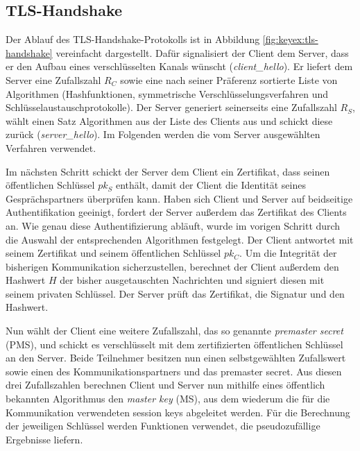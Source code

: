 \subsection{TLS-Handshake}
Der Ablauf des TLS-Handshake-Protokolls ist in Abbildung
\ref{fig:keyex:tls-handshake} vereinfacht dargestellt.
Dafür signalisiert der Client dem Server, dass er den Aufbau eines verschlüsselten Kanals wünscht (\emph{client\_hello}). Er liefert
dem Server eine Zufallszahl $R_C$ sowie eine nach seiner Präferenz sortierte Liste von Algorithmen (Hashfunktionen, symmetrische
Verschlüsselungsverfahren und Schlüsselaustauschprotokolle). Der Server generiert seinerseits eine Zufallszahl $R_S$, wählt einen Satz
Algorithmen aus der Liste des Clients aus und schickt diese zurück (\emph{server\_hello}). Im Folgenden werden die vom Server ausgewählten
Verfahren verwendet.

Im nächsten Schritt schickt der Server dem Client ein Zertifikat, dass
seinen öffentlichen Schlüssel $pk_S$ enthält, damit der Client
die Identität seines Gesprächspartners überprüfen kann. Haben sich
Client und Server auf beidseitige Authentifikation geeinigt, fordert der
Server außerdem das Zertifikat des Clients an.  Wie genau diese
Authentifizierung abläuft, wurde im vorigen Schritt durch die Auswahl
der entsprechenden Algorithmen festgelegt. Der Client antwortet mit
seinem Zertifikat und seinem öffentlichen Schlüssel $pk_C$. Um die
Integrität der bisherigen Kommunikation sicherzustellen, berechnet der
Client außerdem den Hashwert $H$ der bisher ausgetauschten Nachrichten
und signiert diesen mit seinem privaten Schlüssel. Der Server prüft das
Zertifikat, die Signatur und den Hashwert.

Nun wählt der Client eine weitere Zufallszahl, das so genannte \emph{premaster secret} (PMS), und schickt es verschlüsselt mit dem
zertifizierten öffentlichen Schlüssel an den Server. Beide Teilnehmer besitzen nun einen selbstgewählten Zufallswert sowie einen des
Kommunikationspartners und das premaster secret. Aus diesen drei Zufallszahlen berechnen Client und Server nun mithilfe eines öffentlich bekannten
Algorithmus den \emph{master key} (MS), aus dem wiederum die für die Kommunikation verwendeten session keys abgeleitet werden.
Für die Berechnung der jeweiligen Schlüssel werden Funktionen verwendet, die pseudozufällige Ergebnisse liefern.

